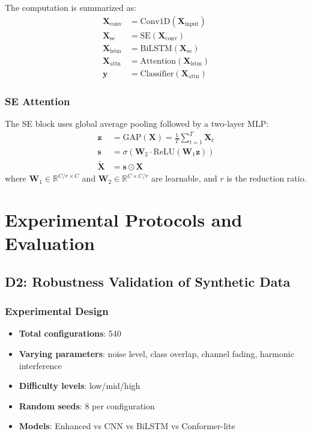 The computation is summarized as:
\begin{align}
\mathbf{X}_{\text{conv}} &= \text{Conv1D}(\mathbf{X}_{\text{input}}) \\
\mathbf{X}_{\text{se}} &= \text{SE}(\mathbf{X}_{\text{conv}}) \\
\mathbf{X}_{\text{lstm}} &= \text{BiLSTM}(\mathbf{X}_{\text{se}}) \\
\mathbf{X}_{\text{attn}} &= \text{Attention}(\mathbf{X}_{\text{lstm}}) \\
\mathbf{y} &= \text{Classifier}(\mathbf{X}_{\text{attn}})
\end{align}

\subsubsection{SE Attention}
The SE block uses global average pooling followed by a two-layer MLP:
\begin{align}
\mathbf{z} &= \text{GAP}(\mathbf{X}) = \frac{1}{T}\sum_{t=1}^{T}\mathbf{X}_t \\
\mathbf{s} &= \sigma(\mathbf{W}_2 \cdot \text{ReLU}(\mathbf{W}_1 \mathbf{z})) \\
\tilde{\mathbf{X}} &= \mathbf{s} \odot \mathbf{X}
\end{align}
where $\mathbf{W}_1 \in \mathbb{R}^{C/r \times C}$ and $\mathbf{W}_2 \in \mathbb{R}^{C \times C/r}$ are learnable, and $r$ is the reduction ratio.

\section{Experimental Protocols and Evaluation}
\label{sec:protocols}

\subsection{D2: Robustness Validation of Synthetic Data}
\label{subsec:d2_protocol}

\subsubsection{Experimental Design}
\begin{itemize}
\item \textbf{Total configurations}: 540
\item \textbf{Varying parameters}: noise level, class overlap, channel fading, harmonic interference
\item \textbf{Difficulty levels}: low/mid/high
\item \textbf{Random seeds}: 8 per configuration
\item \textbf{Models}: Enhanced vs CNN vs BiLSTM vs Conformer-lite
\end{itemize}

